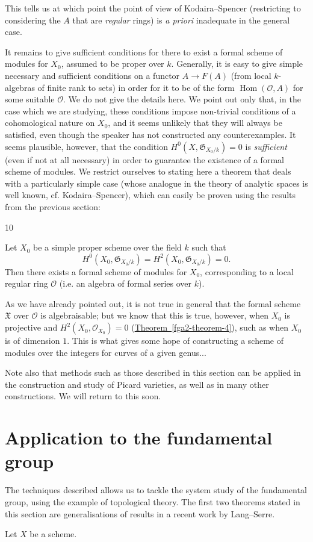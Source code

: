   This tells us at which point the point of view of Kodaira–Spencer (restricting to considering the \(A\) that are \emph{regular} rings) is \emph{a priori} inadequate in the general case.\par{}It remains to give sufficient conditions for there to exist a formal scheme of modules for \(X_0\), assumed to be proper over \(k\).
  Generally, it is easy to give simple necessary and sufficient conditions on a functor \(A\to  F(A)\) (from local \(k\)-algebras of finite rank to sets) in order for it to be of the form \(\operatorname {Hom}(\mathcal {O},A)\) for some suitable \(\mathcal {O}\).
  We do not give the details here.
  We point out only that, in the case which we are studying, these conditions impose non-trivial conditions of a cohomological nature on \(X_0\), and it seems unlikely that they will always be satisfied, even though the speaker has not constructed any counterexamples.
  It seems plausible, however, that the condition \(H^0(X,\mathfrak {G}_{X_0/k})=0\) is \emph{sufficient} (even if not at all necessary) in order to guarantee the existence of a formal scheme of modules.
  We restrict ourselves to stating here a theorem that deals with a particularly simple case (whose analogue in the theory of analytic spaces is well known, cf. Kodaira–Spencer), which can easily be proven using the results from the previous section:\begin{theorem}{10}\label{fga2-theorem-10}\skipsinglepar\par{}Let \(X_0\) be a simple proper scheme over the field \(k\) such that
    \[       H^0(X_0,\mathfrak {G}_{X_0/k})       = H^2(X_0,\mathfrak {G}_{X_0/k})       = 0.     \]
    Then there exists a formal scheme of modules for \(X_0\), corresponding to a local regular ring \(\mathcal {O}\) (i.e. an algebra of formal series over \(k\)).\end{theorem}\par{}As we have already pointed out, it is not true in general that the formal scheme \(\mathfrak {X}\) over \(\mathcal {O}\) is algebraisable;
  but we know that this is true, however, when \(X_0\) is projective and \(H^2(X_0,\mathcal {O}_{X_0})=0\) (\hyperref[fga2-theorem-4]{Theorem~\ref*{fga2-theorem-4}}), such as when \(X_0\) is of dimension \(1\).
  This is what gives some hope of constructing a scheme of modules over the integers for curves of a given genus...\par{}Note also that methods such as those described in this section can be applied in the construction and study of Picard varieties, as well as in many other constructions.
  We will return to this soon.\chapter{Application to the fundamental group}\thispagestyle{fancy}\label{fga2-8}\par{}The techniques described allows us to tackle the system study of the fundamental group, using the example of topological theory.
  The first two theorems stated in this section are generalisations of results in a recent work by Lang–Serre.\par{}Let \(X\) be a scheme.
  
